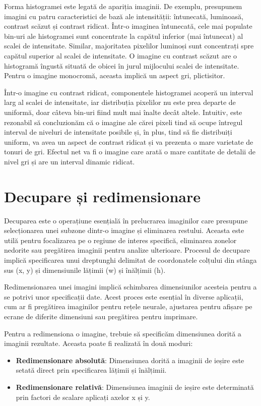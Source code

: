 \documentclass[a4paper,12pt]{report}
\begin{document}
Forma histogramei este legată de apariția imaginii. De exemplu, presupunem imagini cu patru caracteristici de bază ale intensității: întunecată, luminoasă, contrast scăzut și contrast ridicat. Într-o imaginea întunecată, cele mai populate bin-uri ale histogramei sunt concentrate la capătul inferior (mai întunecat) al scalei de intensitate. Similar, majoritatea pixelilor luminoși sunt concentrați spre capătul superior al scalei de intensitate. O imagine cu contrast scăzut are o histogramă îngustă situată de obicei în jurul mijlocului scalei de intensitate. Pentru o imagine monocromă, aceasta implică un aspect gri, plictisitor.

Într-o imagine cu contrast ridicat, componentele histogramei acoperă un interval larg al scalei de intensitate, iar distribuția pixelilor nu este prea departe de uniformă, doar câteva bin-uri fiind mult mai înalte decât altele. Intuitiv, este rezonabil să concluzionăm că o imagine ale cărei pixeli tind să ocupe întregul interval de niveluri de intensitate posibile și, în plus, tind să fie distribuiți uniform, va avea un aspect de contrast ridicat și va prezenta o mare varietate de tonuri de gri. Efectul net va fi o imagine care arată o mare cantitate de detalii de nivel gri și are un interval dinamic ridicat.

\section{Decupare și redimensionare}
Decuparea este o operațiune esențială în prelucrarea imaginilor care presupune selecționarea unei subzone dintr-o imagine și eliminarea restului. Aceasta este utilă pentru focalizarea pe o regiune de interes specifică, eliminarea zonelor nedorite sau pregătirea imaginii pentru analize ulterioare. Procesul de decupare implică specificarea unui dreptunghi delimitat de coordonatele colțului din stânga sus (x, y) și dimensiunile lățimii (w) și înălțimii (h).

Redimensionarea unei imagini implică schimbarea dimensiunilor acesteia pentru a se potrivi unor specificații date. Acest proces este esențial în diverse aplicații, cum ar fi pregătirea imaginilor pentru rețele neurale, ajustarea pentru afișare pe ecrane de diferite dimensiuni sau pregătirea pentru imprimare.

Pentru a redimensiona o imagine, trebuie să specificăm dimensiunea dorită a imaginii rezultate. Aceasta poate fi realizată în două moduri:
\begin{itemize}
    \item \textbf{Redimensionare absolută}: Dimensiunea dorită a imaginii de ieșire este setată direct prin specificarea lățimii și înălțimii.
    \item \textbf{Redimensionare relativă}: Dimensiunea imaginii de ieșire este determinată prin factori de scalare aplicați axelor x și y.
\end{itemize}
\end{document}
